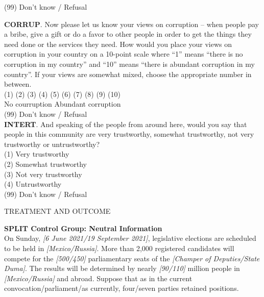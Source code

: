 \documentclass[11pt, ngerman,english,a4]{article}
\begin{document}
\noindent (99) Don't know / Refusal \\

\newpage

\noindent \textbf{CORRUP}. Now please let us know your views on corruption – when people pay a bribe, give a gift or do a favor to other people in order to get the things they need done or the services they need. How would you place your views on corruption in your country on a 10-point scale where “1” means “there is no corruption in my country” and “10” means “there is abundant corruption in my country”. If your views are somewhat mixed, choose the appropriate number in between. \\

\noindent (1) \hspace{0.1cm} (2) \hspace{0.1cm} (3) \hspace{0.1cm} (4) \hspace{0.1cm} (5) \hspace{0.1cm} (6) \hspace{0.1cm} (7) \hspace{0.1cm} (8) \hspace{0.1cm} (9) \hspace{0.1cm} (10) \\
No courruption \hspace{6cm} Abundant corruption \\

\noindent (99) Don't know / Refusal \\



\noindent \textbf{INTERT}. And speaking of the people from around here, would you say that people in this community are very trustworthy, somewhat trustworthy, not very trustworthy or
untrustworthy? \\
(1) Very trustworthy \\
(2) Somewhat trustworthy \\
(3) Not very trustworthy \\
(4) Untrustworthy \\
(99) Don't know / Refusal \\

\vspace{1cm}

\begin{center}
    TREATMENT AND OUTCOME
\end{center}

\noindent \textbf{SPLIT Control Group: Neutral Information} \\
On Sunday, \textit{[6 June 2021/19 September 2021]}, legislative elections are scheduled to be held in \textit{[Mexico/Russia]}. More than 2,000 registered candidates will compete for the \textit{[500/450]} parliamentary seats of the \textit{[Champer of Deputies/State Duma]}. The results will be determined by nearly \textit{[90/110]} million people in \textit{[Mexico/Russia]} and abroad. Suppose that as in the current convocation/parliament/as currently, four/seven parties retained positions. \\
\end{document}
